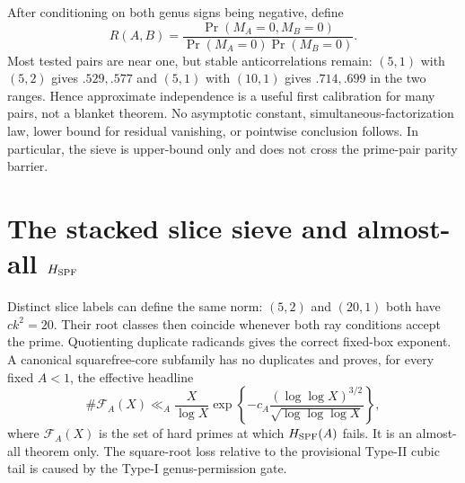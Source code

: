 \documentclass[10pt,reqno]{amsart}
\theoremstyle{definition}
\newcommand{\1}{\mathbf 1}
\begin{document}
After conditioning on both genus signs being negative, define
\begin{equation}\tag{52.26}
 R(A,B)=\frac{\Pr(M_A=0,M_B=0)}{\Pr(M_A=0)\Pr(M_B=0)}.
\end{equation}
Most tested pairs are near one, but stable anticorrelations remain:
$(5,1)$ with $(5,2)$ gives $.529,.577$ and $(5,1)$ with $(10,1)$ gives
$.714,.699$ in the two ranges.  Hence approximate independence is a useful
first calibration for many pairs, not a blanket theorem.  No asymptotic
constant, simultaneous-factorization law, lower bound for residual
vanishing, or pointwise conclusion follows.  In particular, the sieve is
upper-bound only and does not cross the prime-pair parity barrier.

\section{The stacked slice sieve and almost-all $H_{\rm SPF}$}
\label{sec:stacked-sieve}
Distinct slice labels can define the same norm: $(5,2)$ and $(20,1)$ both
have $ck^2=20$.  Their root classes then coincide whenever both ray
conditions accept the prime.  Quotienting duplicate radicands gives the
correct fixed-box exponent.  A canonical squarefree-core subfamily has no
duplicates and proves, for every fixed $A<1$, the effective headline
\begin{equation}\tag{53.1}
 \#\mathcal F_A(X)\ll_A\frac X{\log X}
 \exp\left\{-c_A\frac{(\log\log X)^{3/2}}
                         {\sqrt{\log\log\log X}}\right\},
\end{equation}
where $\mathcal F_A(X)$ is the set of hard primes at which
$H_{\rm SPF}(A)$ fails.
It is an almost-all theorem only.  The square-root loss relative to the
provisional Type-II cubic tail is caused by the Type-I genus-permission
gate.
\end{document}
